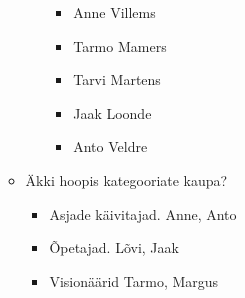 \documentclass{tufte-book}
\begin{document}
\begin{itemize}
\begin{itemize}
\begin{itemize}
				\begin{itemize}
					\item Anne Villems
					\item Tarmo Mamers
					\item Tarvi Martens
					\item Jaak Loonde
					\item Anto Veldre
				\end{itemize}
			\end{itemize}
		\item Äkki hoopis kategooriate kaupa?
		\begin{itemize}
			\item Asjade käivitajad. Anne, Anto
			\item Õpetajad. Lõvi, Jaak
			\item Visionäärid Tarmo, Margus
		\end{itemize}
	\end{itemize}
\end{itemize}





\backmatter





\printindex[ppl]
\printindex
\end{document}
